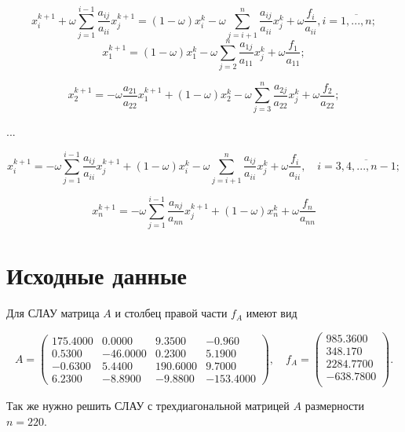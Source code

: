 \documentclass[12pt, a4paper]{article}
\begin{document}
\[
x_{i}^{k+1} + \omega\sum_{j = 1}^{i - 1}\dfrac{a_{ij}}{a_{ii}}x_{j}^{k+1} = (1 - \omega)x_i^k - \omega\sum_{j = i + 1}^{n}\dfrac{a_{ij}}{a_{ii}}x_j^k + \omega\dfrac{f_i}{a_{ii}}, i=\overline{1,..., n} ;
\]
\[
x_1^{k+1} = (1 - \omega)x_1^k - \omega\sum_{j = 2}^{n}\dfrac{a_{1j}}{a_{11}}x_j^k + \omega \dfrac{f_1}{a_{11}};
\]

\[
x_2^{k+1} = -\omega\dfrac{a_{21}}{a_{22}}x_1^{k+1} +(1 - \omega)x_2^k - \omega\sum_{j = 3}^{n}\dfrac{a_{2j}}{a_{22}}x_j^k + \omega \dfrac{f_2}{a_{22}};
\]

\centerline{...}

\[
x_i^{k+1} = -\omega\sum_{j=1}^{i-1}\dfrac{a_{ij}}{a_{ii}}x_j^{k+1} +(1 - \omega)x_i^k - \omega\sum_{j = i+1}^{n}\dfrac{a_{ij}}{a_{ii}}x_j^k + \omega \dfrac{f_i}{a_{ii}}, \quad i = \overline{3,4,..., n-1};
\]

\[
x_n^{k+1} = -\omega\sum_{j=1}^{i-1}\dfrac{a_{nj}}{a_{nn}}x_j^{k+1} +(1 - \omega)x_n^k  + \omega \dfrac{f_n}{a_{nn}}
\]




\section{Исходные данные}
Для СЛАУ матрица $A$ и столбец правой части $f_A$ имеют вид 

\[
    A = 
    \begin{pmatrix}
     175.4000    &     0.0000   &      9.3500    &    -0.960\\
  0.5300  &     -46.0000   &      0.2300    &     5.1900\\
 -0.6300    &     5.4400  &     190.6000     &    9.7000\\
  6.2300     &   -8.8900     &   -9.8800    &  -153.4000
  

    \end{pmatrix}, \quad f_{A} = 
    \begin{pmatrix}
 985.3600\\
 348.170\\
2284.7700\\
-638.7800\\

    \end{pmatrix}.
\]

Так же нужно решить СЛАУ с трехдиагональной матрицей $A$ размерности $n = 220$. 
\end{document}
